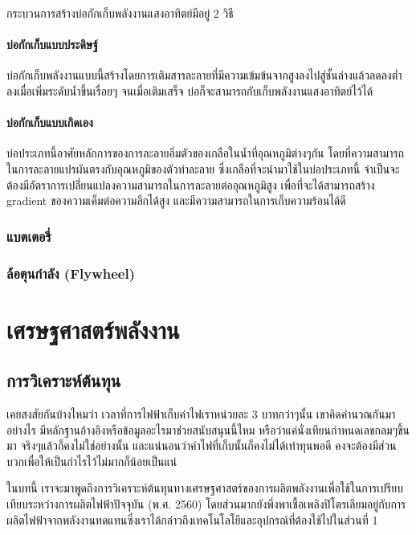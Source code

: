 \message{ !name(solar.tex)}\documentclass[
a4paper,
svgnames,
openany,
justified,
]{tufte-book}
\begin{document}
กระบวนการสร้างบ่อกักเก็บพลังงานแสงอาทิตย์มีอยู่ 2 วิธี

\subsection{บ่อกักเก็บแบบประดิษฐ์}

บ่อกักเก็บพลังงานแบบนี้สร้างโดยการเติมสารละลายที่มีความเข้มข้นจากสูงลงไปสู่ชั้นล่างแล้วลดลงต่ำลงเมื่อเพิ่มระดับน้ำขึ้นเรื่อยๆ จนเมื่อเติมเสร็จ บ่อก็จะสามารถกับเก็บพลังงานแสงอาทิตย์ไว้ได้

\subsection{บ่อกักเก็บแบบเกิดเอง}

บ่อประเภทนี้อาศัยหลักการของการละลายอิ่มตัวของเกลือในน้ำที่อุณหภูมิต่างๆกัน โดยที่ความสามารถในการละลายแปรผันตรงกับอุณหภูมิของตัวทำละลาย ซึ่งเกลือที่จะนำมาใช้ในบ่อประเภทนี้ จำเป็นจะต้องมีอัตราการเปลี่่ยนแปลงความสามารถในการละลายต่ออุณหภูมิสูง เพื่อที่จะได้สามารถสร้าง gradient ของความเค็มต่อความลึกได้สูง และมีความสามารถในการเก็บความร้อนได้ดี
\section{แบตเตอรี่}

\section{ล้อตุนกำลัง (Flywheel)}


\part{เศรษฐศาสตร์พลังงาน}

\chapter{การวิเคราะห์ต้นทุน}

เคยสงสัยกันบ้างไหมว่า เวลาที่การไฟฟ้าเก็บค่าไฟเราหน่วยละ 3 บาทกว่าๆนั้น เขาคิดคำนวณกันมาอย่างไร มีหลักฐานอ้างอิงหรือข้อมูลอะไรมาช่วยสนับสนุนนี้ไหม หรือว่าแค่นั่งเทียนกำหนดเลขกลมๆขึ้นมา จริงๆแล้วก็คงไม่ใช่อย่างนั้น และแน่นอนว่าค่าไฟที่เก็บนั้นก็คงไม่ได้เท่าทุนพอดี คงจะต้องมีส่วนบวกเพื่อให้เป็นกำไรไว้ไม่มากก็น้อยเป็นแน่

ในบทนี้ เราจะมาพูดถึงการวิเคราะห์ต้นทุนทางเศรษฐศาสตร์ของการผลิตพลังงานเพื่อใช้ในการเปรียบเทียบระหว่างการผลิตไฟฟ้าปัจจุบัน (พ.ศ. 2560) โดยส่วนมากยังพึ่งพาเชื้อเพลิงปิโตรเลียมอยู่กับการผลิตไฟฟ้าจากพลังงานทดแทนซึ่งเราได้กล่าวถึงเทคโนโลโยีและอุปกรณ์ที่ต้องใช้ไปในส่วนที่ 1
\end{document}
